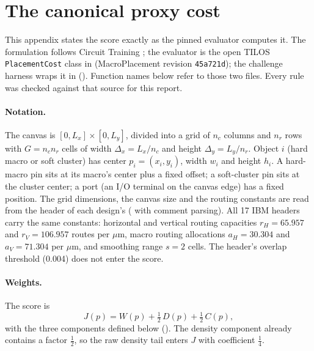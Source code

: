 \section{The canonical proxy cost}\label{app:objective}

This appendix states the score exactly as the pinned evaluator computes it. The
formulation follows Circuit Training \citep{mirhoseini2021graph}; the evaluator is the
open TILOS \texttt{PlacementCost} class in 
(MacroPlacement revision \texttt{45a721d}); the challenge harness wraps it in
 (). Function names below refer
to those two files. Every rule was checked against that source for this report.

\paragraph{Notation.} The canvas is $[0,L_x]\times[0,L_y]$, divided into a grid of
$n_c$ columns and $n_r$ rows with $G=n_cn_r$ cells of width $\Delta_x=L_x/n_c$ and
height $\Delta_y=L_y/n_r$. Object $i$ (hard macro or soft cluster) has center
$p_i=(x_i,y_i)$, width $w_i$ and height $h_i$. A hard-macro pin sits at its
macro's center plus a fixed offset; a soft-cluster pin sits at the cluster center;
a port (an I/O terminal on the canvas edge) has a fixed position. The grid
dimensions, the canvas size and the routing constants are read from the header of
each design's  ( with comment
parsing). All 17 IBM headers carry the same constants: horizontal and vertical
routing capacities $r_H=65.957$ and $r_V=106.957$ routes per $\mu$m, macro routing
allocations $a_H=30.304$ and $a_V=71.304$ per $\mu$m, and smoothing range $s=2$
cells. The header's overlap threshold (0.004) does not enter the score.



\paragraph{Weights.} The score is
\begin{equation}
  J(p)=W(p)+\tfrac12\,D(p)+\tfrac12\,C(p),
  \label{eq:app-proxy}
\end{equation}
with the three components defined below (). The density
component already contains a factor $\tfrac12$, so the raw density tail enters $J$
with coefficient $\tfrac14$.

